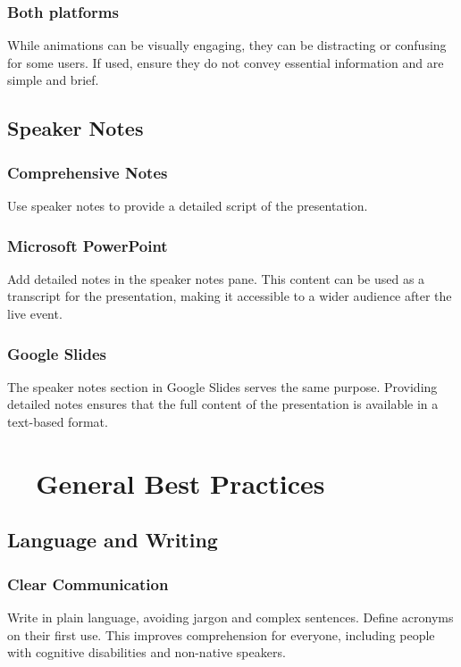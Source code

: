 \subsubsection{Both platforms}\label{ch15:sssec:animations-both}
While animations can be visually engaging, they can be distracting or confusing for some users. If used, ensure they do not convey essential information and are simple and brief.

\subsection{Speaker Notes}\label{ch15:ssec:speaker-notes}

\subsubsection{Comprehensive Notes}\label{ch15:sssec:comprehensive-notes}
Use speaker notes to provide a detailed script of the presentation.

\subsubsection{Microsoft PowerPoint}\label{ch15:sssec:ppt-speaker-notes}
Add detailed notes in the speaker notes pane. This content can be used as a transcript for the presentation, making it accessible to a wider audience after the live event.

\subsubsection{Google Slides}\label{ch15:sssec:slides-speaker-notes}
The speaker notes section in Google Slides serves the same purpose. Providing detailed notes ensures that the full content of the presentation is available in a text-based format.

\section{~~General Best Practices}\label{ch15:sec:general-best-practices}

\subsection{Language and Writing}\label{ch15:ssec:language-writing}

\subsubsection{Clear Communication}\label{ch15:sssec:clear-communication}
Write in plain language, avoiding jargon and complex sentences. Define acronyms on their first use. This improves comprehension for everyone, including people with cognitive disabilities and non-native speakers.

